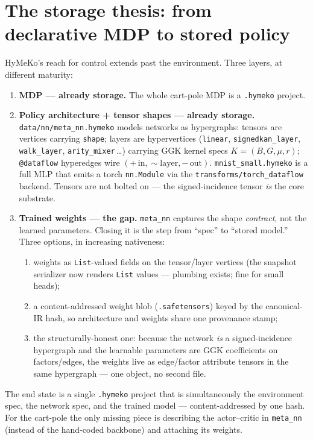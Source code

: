 \documentclass[11pt]{article}
\newcommand{\code}[1]{\texttt{\small #1}}
\begin{document}
\section{The storage thesis: from declarative MDP to stored policy}
HyMeKo's reach for control extends past the environment. Three layers, at different maturity:
\begin{enumerate}[nosep]
  \item \textbf{MDP --- already storage.} The whole cart-pole MDP is a \code{.hymeko} project.
  \item \textbf{Policy architecture + tensor shapes --- already storage.} \code{data/nn/meta\_nn.hymeko}
        models networks as hypergraphs: tensors are vertices carrying \code{shape}; layers are hypervertices
        (\code{linear}, \code{signedkan\_layer}, \code{walk\_layer}, \code{arity\_mixer}\,\ldots) carrying
        GGK kernel specs $K=(B,G,\mu,r)$; \code{@dataflow} hyperedges wire $(+\,\text{in},\sim\text{layer},
        -\,\text{out})$. \code{mnist\_small.hymeko} is a full MLP that emits a torch \code{nn.Module} via the
        \code{transforms/torch\_dataflow} backend. Tensors are not bolted on --- the signed-incidence tensor
        \emph{is} the core substrate.
  \item \textbf{Trained weights --- the gap.} \code{meta\_nn} captures the shape \emph{contract}, not the
        learned parameters. Closing it is the step from ``spec'' to ``stored model.'' Three options, in
        increasing nativeness:
        \begin{enumerate}[label=(\alph*),nosep]
          \item weights as \code{List}-valued fields on the tensor/layer vertices (the snapshot serializer
                now renders \code{List} values --- plumbing exists; fine for small heads);
          \item a content-addressed weight blob (\code{.safetensors}) keyed by the canonical-IR hash, so
                architecture and weights share one provenance stamp;
          \item the structurally-honest one: because the network \emph{is} a signed-incidence hypergraph and
                the learnable parameters are GGK coefficients on factors/edges, the weights live as
                edge/factor attribute tensors in the same hypergraph --- one object, no second file.
        \end{enumerate}
\end{enumerate}
The end state is a single \code{.hymeko} project that is simultaneously the environment spec, the network
spec, and the trained model --- content-addressed by one hash. For the cart-pole the only missing piece is
describing the actor--critic in \code{meta\_nn} (instead of the hand-coded backbone) and attaching its
weights.
\end{document}
